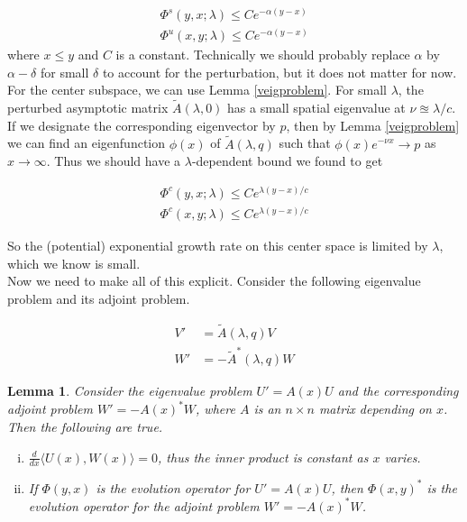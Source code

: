 \documentclass[12pt]{article}
\newtheorem{lemma}{Lemma}
\begin{document}
\begin{align*}
\Phi^s(y, x; \lambda) \leq C e^{-\alpha(y-x)} \\
\Phi^u(x, y; \lambda) \leq C e^{-\alpha(y-x)}
\end{align*}
where $x \leq y$ and $C$ is a constant. Technically we should probably replace $\alpha$ by $\alpha - \delta$ for small $\delta$ to account for the perturbation, but it does not matter for now.\\

For the center subspace, we can use Lemma \ref{veigproblem}. For small $\lambda$, the perturbed asymptotic matrix $\tilde{A}(\lambda, 0)$ has a small spatial eigenvalue at $\nu \approxeq \lambda / c$. If we designate the corresponding eigenvector by $p$, then by Lemma \ref{veigproblem} we can find an eigenfunction $\phi(x)$ of $\tilde{A}(\lambda, q)$ such that $\phi(x) e^{-\nu x} \rightarrow p$ as $x \rightarrow \infty$. Thus we should have a $\lambda$-dependent bound we found to get

\begin{align*}
\Phi^c(y, x; \lambda) \leq C e^{\lambda(y-x)/c} \\
\Phi^c(x, y; \lambda) \leq C e^{\lambda(y-x)/c}
\end{align*}

So the (potential) exponential growth rate on this center space is limited by $\lambda$, which we know is small.\\

Now we need to make all of this explicit. Consider the following eigenvalue problem and its adjoint problem.

\begin{align}
V' &= \tilde{A}(\lambda, q)V \label{eig:V} \\
W' &= -\tilde{A}^*(\lambda, q)W \label{eig:W}
\end{align}

\begin{lemma}Consider the eigenvalue problem $U' = A(x)U$ and the corresponding adjoint problem $W' = -A(x)^* W$, where $A$ is an $n \times n$ matrix depending on $x$. Then the following are true.
\begin{enumerate}[(i)]
\item $\frac{d}{dx}\langle U(x), W(x) \rangle = 0$, thus the inner product is constant as $x$ varies.
\item If $\Phi(y, x)$ is the evolution operator for $U' = A(x)U$, then $\Phi(x, y)^*$ is the evolution operator for the adjoint problem $W' = -A(x)^* W$.
\end{enumerate}
\end{lemma}
\end{document}
